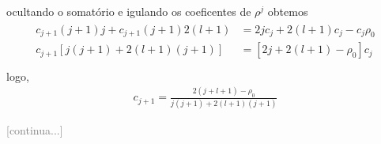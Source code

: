 \begin{prob}
	 ocultando o somatório e igulando os coeficentes de $\rho^{j}$ obtemos
	 \begin{align}
		 \begin{split}
			 c_{j+1}(j+1)j+c_{j+1}(j+1)2(l+1) &= 2jc_{j}+2(l+1)c_{j}-c_{j} \rho_{0}\\
			 c_{j+1}\left[j(j+1)+2(l+1)(j+1)\right] &= \left[2j+2(l+1)-\rho_{0}\right]c_{j}\\
		 \end{split}	
	 \end{align}
	 logo,
	 \begin{align}
		 \boxed{
			 c_{j+1} = \frac{2\left(j+l+1\right)-\rho_{0}}{j(j+1)+2(l+1)(j+1)}
		 }
	 \end{align}
 \end{prob}
\textcolor{gray}{[continua...]}


